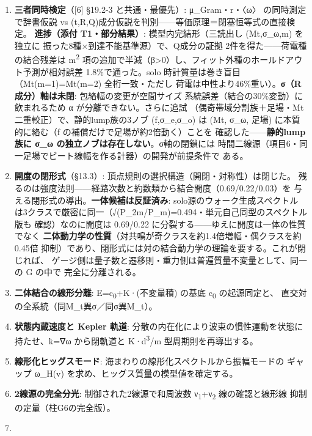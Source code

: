 \documentclass[
]{ltjarticle}
\providecommand{\tightlist}{%
  \setlength{\itemsep}{0pt}\setlength{\parskip}{0pt}}
\begin{document}
\begin{enumerate}
\def\labelenumi{\arabic{enumi}.}
\tightlist
\item
  \textbf{三者同時検定}（{[}6{]} §19.2-3 と共通・最優先）:
  μ\_Gram・r・〈ω〉 の同時測定 で辞書仮説 vs
  (t,R,Q)成分仮説を判別------等価原理＝閉塞恒等式の直接検定。
  \textbf{進捗（添付 T1・部分結果）}: 模型内完結形（三読出し (Mt,σ\_ω,m)
  を独立に 振った8種×到達不能基準源）で、Q成分の証拠
  2件を得た------荷電種の結合残差は m\textsuperscript{2}
  項の追加で半減（β\textgreater0）し、フィット外種のホールドアウト予測が相対誤差
  1.8\%で通った。solo 時計質量は巻き盲目（Mt(m=1)=Mt(m=2)
  全桁一致・ただし
  荷電は中性より46\%重い）。\textbf{σ（R成分）軸は未閉}:
  包絡幅の変更が空間サイズ 系統誤差（結合の30\%変動）に飲まれるため α
  が分離できない。さらに追試
  （偶奇帯域分割族＋足場・Mt二重較正）で、静的lump族の3ノブ
  (f,σ\_e,σ\_o) は (Mt, σ\_ω, 足場) に本質的に絡む（f
  の補償だけで足場が約2倍動く）ことを 確認した------\textbf{静的lump族に
  σ\_ω の独立ノブは存在しない}。σ軸の閉鎖には
  時間二線源（項目6・同一足場でビート線幅を作る計器）の開発が前提条件で
  ある。
\item
  \textbf{開度の閉形式}（§13.3）:
  頂点規則の選択構造（開閉・対称性）は閉じた。
  残るのは強度法則------経路次数と約数類から結合開度（0.69/0.22/0.03）を
  与える閉形式の導出。\textbf{一体候補は反証済み}:
  solo源のウォーク生成スペクトル
  は3クラスで厳密に同一（√(P\_2m/P\_m)=0.494・単元自己同型のスペクトル版も
  確認）なのに開度は 0.69/0.22
  に分裂する------ゆえに開度は一体の性質でなく
  \textbf{二体動力学の性質}（対共鳴が奇クラスを約1.4倍増幅・偶クラスを約0.45倍
  抑制）であり、閉形式には対の結合動力学の理論を要する。これが閉じれば、
  ゲージ側は量子数と遷移則・重力側は普遍質量不変量として、同一の G
  の中で 完全に分離される。
\item
  \textbf{二体結合の線形分離}: E=c\textsubscript{0}+K·(不変量積) の基底
  c\textsubscript{0} の起源同定と、
  直交対の全系統（同M\_t異σ／同σ異M\_t）。
\item
  \textbf{状態内蔵速度と Kepler 軌道}:
  分散の内在化により波束の慣性運動を状態に 持たせ、k̇=∇ω から閉軌道と
  K·d\textsuperscript{3}/m 型周期則を再導出する。
\item
  \textbf{線形化ヒッグスモード}:
  海まわりの線形化スペクトルから振幅モードの ギャップ ω\_H(v)
  を求め、ヒッグス質量の模型値を確定する。
\item
  \textbf{2線源の完全分光}: 制御された2線源で和周波数
  ν\textsubscript{1}+ν\textsubscript{2} 線の確認と線形線
  抑制の定量（柱G6の完全版）。
\item

\end{enumerate}
\end{document}
